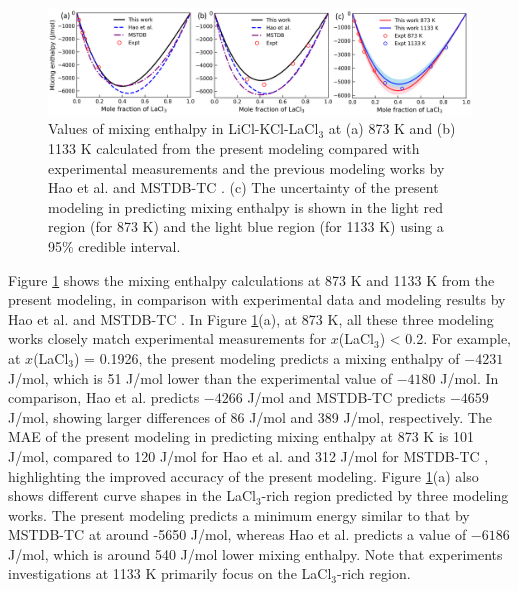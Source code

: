 \begin{figure} [H]
    \centering
    \includegraphics[width=1\linewidth]{moltensalts/Moltensalts-LaCl3-HMR-Ternary-UQ-models.png}
    \caption{Values of mixing enthalpy in LiCl-KCl-LaCl$_3$ at (a) 873 K and (b) 1133 K calculated from the present modeling compared with experimental measurements and the previous modeling works by Hao et al. \cite{hao2024thermodynamic} and MSTDB-TC \cite{ard2022development}. (c) The uncertainty of the present modeling in predicting mixing enthalpy is shown in the light red region (for 873 K) and the light blue region (for 1133 K) using a 95\% credible interval.}
    \label{ms:fig:lacl3ternaryHMRUQ}
\end{figure}


Figure \ref{ms:fig:lacl3ternaryHMRUQ} shows the mixing enthalpy calculations at 873 K and 1133 K from the present modeling, in comparison with experimental data and modeling results by Hao et al. \cite{hao2024thermodynamic} and MSTDB-TC \cite{ard2022development}. In Figure \ref{ms:fig:lacl3ternaryHMRUQ}(a), at 873 K, all these three modeling works closely match experimental measurements for $x$(LaCl$_3$) < 0.2. For example, at $x$(LaCl$_3$) = 0.1926, the present modeling predicts a mixing enthalpy of $-4231$ J/mol, which is 51 J/mol lower than the experimental value of $-4180$ J/mol. In comparison, Hao et al. \cite{hao2024thermodynamic} predicts $-4266$ J/mol and MSTDB-TC \cite{ard2022development} predicts $-4659$ J/mol, showing larger differences of 86 J/mol and 389 J/mol, respectively. The MAE of the present modeling in predicting mixing enthalpy at 873 K is 101 J/mol, compared to 120 J/mol for Hao et al. \cite{hao2024thermodynamic} and 312 J/mol for MSTDB-TC \cite{ard2022development}, highlighting the improved accuracy of the present modeling. Figure \ref{ms:fig:lacl3ternaryHMRUQ}(a) also shows different curve shapes in the LaCl$_3$-rich region predicted by three modeling works. The present modeling predicts a minimum energy similar to that by MSTDB-TC \cite{ard2022development} at around -5650 J/mol, whereas Hao et al. \cite{hao2024thermodynamic} predicts a value of $-6186$ J/mol, which is around 540 J/mol lower mixing enthalpy. Note that experiments investigations at 1133 K primarily focus on the LaCl$_3$-rich region.


